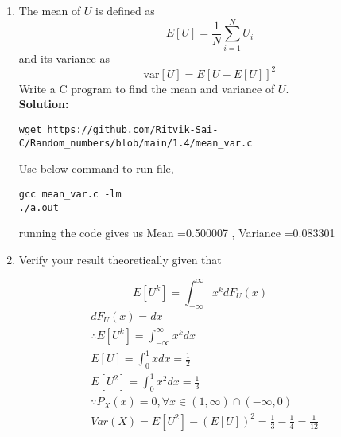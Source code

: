 \documentclass[journal,12pt,twocolumn]{IEEEtran}
\renewcommand\thesection{\arabic{section}}
\providecommand{\sbrak}[1]{\ensuremath{{}\left[#1\right]}}
\theoremstyle{remark}
\newcommand{\solution}{\noindent \textbf{Solution: }}
\numberwithin{equation}{section}
\begin{document}
\begin{enumerate}[label=\thesection.\arabic*
,ref=\thesection.\theenumi]
\begin{align}
	=\int k dx\\
  \text{wkt} \int_{0}^{1} kdx=1\\
  \therefore k=1\\
  \therefore F_{U}(x)=x
	\end{align}	
\item
The mean of $U$ is defined as
%
\begin{equation}
E\sbrak{U} = \frac{1}{N}\sum_{i=1}^{N}U_i
\end{equation}
%
and its variance as
%
\begin{equation}
\text{var}\sbrak{U} = E\sbrak{U- E\sbrak{U}}^2 
\end{equation}
Write a C program to  find the mean and variance of $U$. \\
\solution
\begin{lstlisting}
wget https://github.com/Ritvik-Sai-C/Random_numbers/blob/main/1.4/mean_var.c
\end{lstlisting}
Use below command to run file,
\begin{lstlisting}
gcc mean_var.c -lm
./a.out
\end{lstlisting}
running the code gives us Mean =0.500007 , Variance =0.083301
\item Verify your result theoretically given that
\end{enumerate}
%
\begin{equation}
E\sbrak{U^k} = \int_{-\infty}^{\infty}x^kdF_{U}(x)
\end{equation}
\begin{align}
&dF_{U}(x)=dx\\
&\therefore E[U^k]=\int_{-\infty}^{\infty} x^k dx\\
&E[U]=\int_{0}^{1} x dx=\frac{1}{2}\\
&E[U^2]=\int_{0}^{1} x^2 dx=\frac{1}{3}\\
&\because P_{X}(x)=0 ,\forall x \in (1,\infty)\cap (-\infty,0)\\
&Var(X)=E[U^2]-(E[U])^2=\frac{1}{3}-\frac{1}{4}=\frac{1}{12}
\end{align}
\end{document}
